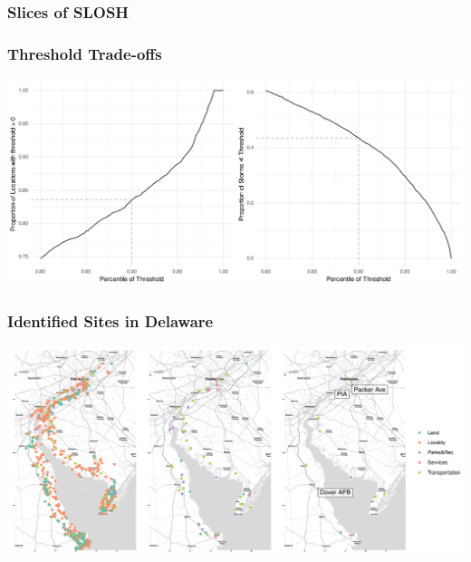 \documentclass[aspectratio=169,10pt]{beamer}
\newlength{\frametextheight}
\begin{document}
\begin{frame}
    \frametitle{Slices of SLOSH}
    \begin{center}
    
    \end{center}
\end{frame} %

\begin{frame}
    \frametitle{Threshold Trade-offs}
    \begin{center}
        \includegraphics[height = 0.99\frametextheight]{./ch3/plots/explore_threshold}
    \end{center}
\end{frame} %

\begin{frame}
    \frametitle{Identified Sites in Delaware}
    \begin{centering}
        \includegraphics[width=0.99\linewidth]{./ch3/plots/delaware}
    \end{centering}
\end{frame} %
\end{document}
